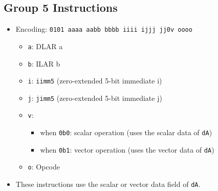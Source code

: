 \documentclass{article}
\begin{document}
	\subsection{Group 5 Instructions}
		\begin{itemize}
		\item Encoding:  \texttt{0101 aaaa aabb bbbb  iiii ijjj jj0v oooo}
			\begin{itemize}
			\item \texttt{a}:  DLAR a
			\item \texttt{b}:  ILAR b
			\item \texttt{i}:  \texttt{iimm5} (zero-extended 5-bit
			immediate i)
			\item \texttt{j}:  \texttt{jimm5} (zero-extended 5-bit
			immediate j)
			\item \texttt{v}:
				\begin{itemize}
				\item when \texttt{0b0}:  scalar operation (uses the scalar
				data of \texttt{dA})
				\item when \texttt{0b1}:  vector operation (uses the vector
				data of \texttt{dA})
				\end{itemize}
			\item \texttt{o}:  Opcode
			\end{itemize}

		\item These instructions use the scalar or vector data field of
		\texttt{dA}.


\end{itemize}
\end{document}
